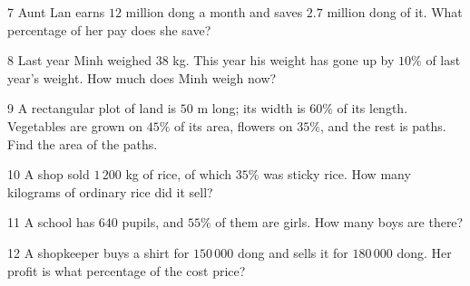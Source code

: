 \gap
\begin{probbox}{7}{\relax}
Aunt Lan earns $12$ million dong a month and saves $2.7$ million dong of it. What percentage of her pay does she save?
\end{probbox}
\gap
\begin{probbox}{8}{\relax}
Last year Minh weighed $38$ kg. This year his weight has gone up by $10\%$ of last year's weight. How much does Minh weigh now?
\end{probbox}
\gap
\begin{probbox}{9}{\relax}
A rectangular plot of land is $50$ m long; its width is $60\%$ of its length. Vegetables are grown on $45\%$ of its area, flowers on $35\%$, and the rest is paths. Find the area of the paths.
\end{probbox}
\gap
\begin{probbox}{10}{\relax}
A shop sold $1\,200$ kg of rice, of which $35\%$ was sticky rice. How many kilograms of ordinary rice did it sell?
\end{probbox}
\gap
\begin{probbox}{11}{\relax}
A school has $640$ pupils, and $55\%$ of them are girls. How many boys are there?
\end{probbox}
\gap
\begin{probbox}{12}{\relax}
A shopkeeper buys a shirt for $150\,000$ dong and sells it for $180\,000$ dong. Her profit is what percentage of the cost price?
\end{probbox}
